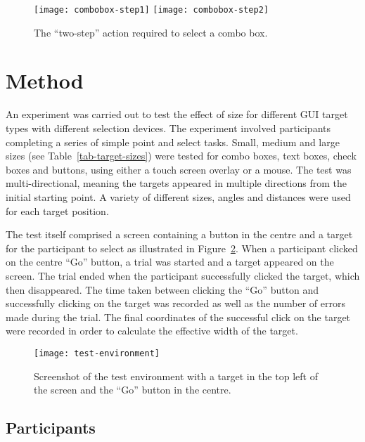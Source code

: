 \documentclass[reviewcopy]{elsart}
\begin{document}
\begin{figure}[ht]
	\centering
	\texttt{[image: combobox-step1]}\quad\quad\quad
	\texttt{[image: combobox-step2]}
	\caption{The ``two-step'' action required to select a combo box.}
	\label{fig-combo-box}
\end{figure}



\section{Method}
\label{sec-method}

An experiment was carried out to test the effect of size for different
GUI target types with different selection devices. The experiment
involved participants completing a series of simple point and select
tasks. Small, medium and large sizes (see Table~\ref{tab-target-sizes})
were tested for combo boxes, text boxes, check boxes and buttons, using
either a touch screen overlay or a mouse. The test was
multi-directional, meaning the targets appeared in multiple directions
from the initial starting point. A variety of different sizes, angles
and distances were used for each target position.

The test itself comprised a screen containing a button in the centre and
a target for the participant to select as illustrated in
Figure~\ref{fig-test-environment}. When a participant clicked on the
centre ``Go'' button, a trial was started and a target appeared on the
screen. The trial ended when the participant successfully clicked the
target, which then disappeared. The time taken between clicking the
``Go'' button and successfully clicking on the target was recorded as
well as the number of errors made during the trial. The final
coordinates of the successful click on the target were recorded in order
to calculate the effective width of the target.


\begin{figure}
	\centering
 	\texttt{[image: test-environment]}
	\caption{Screenshot of the test environment with a target in the
	top left of the screen and the ``Go'' button in the centre.}
	\label{fig-test-environment}
\end{figure}


\subsection{Participants}
\label{sec-method-participants}
\end{document}

